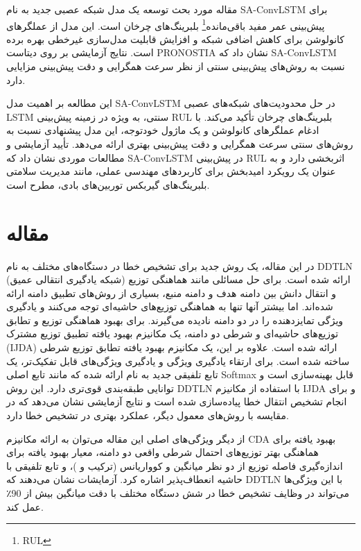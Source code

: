 \documentclass[a4paper,10pt]{article}
\begin{document}
مقاله مورد بحث توسعه یک مدل شبکه عصبی جدید به نام SA-ConvLSTM برای پیش‌بینی عمر مفید باقی‌مانده\footnote{RUL} بلبرینگ‌های چرخان است. این مدل از عملگرهای کانولوشن برای کاهش اضافی شبکه و افزایش قابلیت مدل‌سازی غیرخطی بهره برده است. نتایج آزمایشی بر روی دیتاست PRONOSTIA نشان داد که SA-ConvLSTM نسبت به روش‌های پیش‌بینی سنتی از نظر سرعت همگرایی و دقت پیش‌بینی مزایایی دارد.
	
این مطالعه بر اهمیت مدل SA-ConvLSTM در حل محدودیت‌های شبکه‌های عصبی LSTM سنتی، به ویژه در زمینه پیش‌بینی RUL بلبرینگ‌های چرخان تأکید می‌کند. با ادغام عملگرهای کانولوشن و یک ماژول خودتوجه، این مدل پیشنهادی نسبت به روش‌های سنتی سرعت همگرایی و دقت پیش‌بینی بهتری ارائه می‌دهد. تأیید آزمایشی و مطالعات موردی نشان داد که SA-ConvLSTM در پیش‌بینی RUL اثربخشی دارد و به عنوان یک رویکرد امیدبخش برای کاربردهای مهندسی عملی، مانند مدیریت سلامتی بلبرینگ‌های گیربکس توربین‌های بادی، مطرح است.

	
	\section{مقاله \textcolor{blue}{\cite{article38}}}
در این مقاله، یک روش جدید برای تشخیص خطا در دستگاه‌های مختلف به نام DDTLN (شبکه یادگیری انتقالی عمیق) ارائه شده است. برای حل مسائلی مانند هماهنگی توزیع و انتقال دانش بین دامنه هدف و دامنه منبع، بسیاری از روش‌های تطبیق دامنه ارائه شده‌اند. اما بیشتر آنها تنها به هماهنگی توزیع‌های حاشیه‌ای توجه می‌کنند و یادگیری ویژگی تمایزدهنده را در دو دامنه نادیده می‌گیرند. برای بهبود هماهنگی توزیع و تطابق توزیع‌های حاشیه‌ای و شرطی دو دامنه، یک مکانیزم بهبود یافته تطبیق توزیع مشترک (IJDA) ارائه شده است. علاوه بر این، یک مکانیزم بهبود یافته تطابق توزیع شرطی ساخته شده است. برای ارتقاء یادگیری ویژگی و یادگیری ویژگی‌های قابل تفکیک‌تر، یک تابع تلفیقی جدید به نام  ارائه شده که مانند تابع اصلی Softmax قابل بهینه‌سازی است و توانایی طبقه‌بندی قوی‌تری دارد. این روش DDTLN با استفاده از مکانیزم IJDA و  برای انجام تشخیص انتقال خطا پیاده‌سازی شده است و نتایج آزمایشی نشان می‌دهد که در مقایسه با روش‌های معمول دیگر، عملکرد بهتری در تشخیص خطا دارد.

از دیگر ویژگی‌های اصلی این مقاله می‌توان به ارائه مکانیزم CDA بهبود یافته برای هماهنگی بهتر توزیع‌های احتمال شرطی واقعی دو دامنه، معیار بهبود یافته برای اندازه‌گیری فاصله توزیع از دو نظر میانگین و کوواریانس (ترکیب  و )، و تابع تلفیقی  با حاشیه انعطاف‌پذیر اشاره کرد. آزمایشات نشان می‌دهند که DDTLN با این ویژگی‌ها می‌تواند در وظایف تشخیص خطا در شش دستگاه مختلف با دقت میانگین بیش از 90٪ عمل کند.
\end{document}
